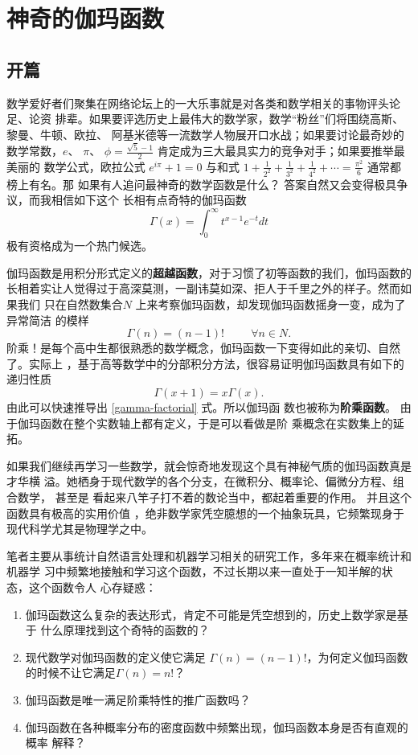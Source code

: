 %
\chapter{神奇的伽玛函数}

\section{开篇}

数学爱好者们聚集在网络论坛上的一大乐事就是对各类和数学相关的事物评头论足、论资
排辈。如果要评选历史上最伟大的数学家，数学“粉丝”们将围绕高斯、黎曼、牛顿、欧拉、
阿基米德等一流数学人物展开口水战；如果要讨论最奇妙的数学常数，$e$、 $\pi$、
$\phi=\frac{\sqrt{5}-1}{2}$ 肯定成为三大最具实力的竞争对手；如果要推举最美丽的
数学公式，欧拉公式 $e^{i\pi} + 1= 0$  与和式 $ 1 + \frac{1}{2^2} +
\frac{1}{3^2} + \frac{1}{4^2} +  \cdots  = \frac{\pi^2}{6} $ 通常都榜上有名。那
如果有人追问最神奇的数学函数是什么？ 答案自然又会变得极具争议，而我相信如下这个
长相有点奇特的伽玛函数
$$ \Gamma(x)=\int_0^{\infty}t^{x-1}e^{-t}dt $$
极有资格成为一个热门候选。

伽玛函数是用积分形式定义的{\bf 超越函数}，对于习惯了初等函数的我们，伽玛函数的
长相着实让人觉得过于高深莫测，一副讳莫如深、拒人于千里之外的样子。然而如果我们
只在自然数集合$N$ 上来考察伽玛函数，却发现伽玛函数摇身一变，成为了异常简洁
的模样
\begin{equation}
\label{gamma-factorial}
\Gamma(n) = (n-1)!  \hspace{1cm} \forall n \in N.
\end{equation}
阶乘！是每个高中生都很熟悉的数学概念，伽玛函数一下变得如此的亲切、自然了。实际上
，基于高等数学中的分部积分方法，很容易证明伽玛函数具有如下的递归性质
$$\Gamma(x+1) = x \Gamma(x) .$$ 
由此可以快速推导出 \eqref{gamma-factorial} 式。所以伽玛函
数也被称为{\bf 阶乘函数}。 由于伽玛函数在整个实数轴上都有定义，于是可以看做是阶
乘概念在实数集上的延拓。

如果我们继续再学习一些数学，就会惊奇地发现这个具有神秘气质的伽玛函数真是才华横
溢。她栖身于现代数学的各个分支，在微积分、概率论、偏微分方程、组合数学， 甚至是
看起来八竿子打不着的数论当中，都起着重要的作用。 并且这个函数具有极高的实用价值
，绝非数学家凭空臆想的一个抽象玩具，它频繁现身于现代科学尤其是物理学之中。

笔者主要从事统计自然语言处理和机器学习相关的研究工作，多年来在概率统计和机器学
习中频繁地接触和学习这个函数，不过长期以来一直处于一知半解的状态，这个函数令人
心存疑惑：
\begin{enumerate}
\item 伽玛函数这么复杂的表达形式，肯定不可能是凭空想到的，历史上数学家是基于
什么原理找到这个奇特的函数的？
\item 现代数学对伽玛函数的定义使它满足 $\Gamma(n) = (n-1)!$，为何定义伽玛函数的时候不让它满足$\Gamma(n) = n!$？
\item 伽玛函数是唯一满足阶乘特性的推广函数吗？
\item 伽玛函数在各种概率分布的密度函数中频繁出现，伽玛函数本身是否有直观的概率
解释？
\end{enumerate}

